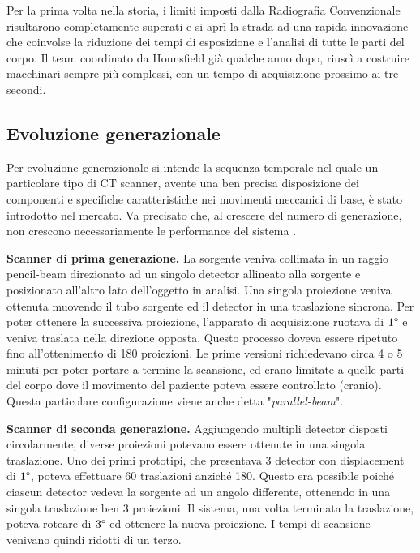 \documentclass[a4paper,12pt, doubleside]{report}
\begin{document}
                \bigskip
                \par
                    Per la prima volta nella storia, i limiti imposti dalla Radiografia Convenzionale risultarono completamente superati e si aprì la strada ad una rapida innovazione che coinvolse la riduzione dei tempi di esposizione e l'analisi di tutte le parti del corpo. Il team coordinato da Hounsfield già qualche anno dopo, riuscì a costruire macchinari sempre più complessi, con un tempo di acquisizione prossimo ai tre secondi.
                            
            \subsection{Evoluzione generazionale}
                \par
                    Per evoluzione generazionale si intende la sequenza temporale nel quale un particolare tipo di CT scanner, avente una ben precisa disposizione dei componenti e specifiche caratteristiche nei movimenti meccanici di base, è stato introdotto nel mercato. Va precisato che, al crescere del numero di generazione, non crescono necessariamente le performance del sistema \cite{generazionale}.
                        
                \bigskip
                \par
                    \textbf{Scanner di prima generazione.} La sorgente veniva collimata in un raggio pencil-beam direzionato ad un singolo detector allineato alla sorgente e posizionato all’altro lato dell'oggetto in analisi. Una singola proiezione veniva ottenuta muovendo il tubo sorgente ed il detector in una traslazione sincrona. Per poter ottenere la successiva proiezione, l'apparato di acquisizione ruotava di $1\degree$ e veniva traslata nella direzione opposta. Questo processo doveva essere ripetuto fino all’ottenimento di 180 proiezioni. Le prime versioni richiedevano circa 4 o 5 minuti per poter portare a termine la scansione, ed erano limitate a quelle parti del corpo dove il movimento del paziente poteva essere controllato (cranio). Questa particolare configurazione viene anche detta "\textit{parallel-beam}".
                            
                \bigskip
                \par
                    \textbf{Scanner di seconda generazione.} Aggiungendo multipli detector disposti circolarmente, diverse proiezioni potevano essere ottenute in una singola traslazione. Uno dei primi prototipi, che presentava 3 detector con displacement di $1\degree$, poteva effettuare 60 traslazioni anziché 180. Questo era possibile poiché ciascun detector vedeva la sorgente ad un angolo differente, ottenendo in una singola traslazione ben 3 proiezioni. Il sistema, una volta terminata la traslazione, poteva roteare di $3\degree$  ed ottenere la nuova proiezione. I tempi di scansione venivano quindi ridotti di un terzo. 
                        
\end{document}

